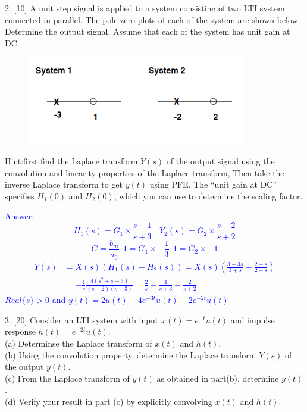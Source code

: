 \documentclass[12pt,a4paper]{article}
\begin{document}
\begin{tcolorbox}[colback = white]
2. [10] A unit step signal is applied to a system consisting of two LTI system connected in parallel. The pole-zero plots of each of the system are shown below. Determine the output signal. Assume that each of
the system has unit gain at DC.
\begin{figure}[H]
	\centering
	\includegraphics{HW6P2.png}
	\label{fig:fig1} 
\end{figure}
Hint:first find the Laplace transform $Y(s)$ of the output signal using the convolution and linearity properties of the Laplace transform, Then take the inverse Laplace transform to get $y(t)$ using PFE. The “unit gain at DC” specifies $H_{1}(0)$ and $H_{2}(0)$, which you can use to determine the scaling factor.

\end{tcolorbox}

\begin{tcolorbox}
\normalsize
\textcolor{blue}{Answer:\\
$$H_1(s)=G_1\times\frac{s-1}{s+3}~~~~Y_2(s)=G_2\times\frac{s-2}{s+2}$$
$$G=\frac{b_m}{a_0}~~1=G_1\times-\frac{1}{3}~~1=G_2\times -1$$
\begin{equation*}
    \begin{aligned}
        Y(s)&=X(s)(H_1(s)+H_2(s))=X(s)(\frac{3-3s}{3+s}+\frac{2-s}{2+s})\\
        &=-\frac{1}{s}\frac{4(s^2+s-3)}{(s+2)(s+3)}=\frac{2}{s}-\frac{4}{s+3}-\frac{2}{s+2}
    \end{aligned}
\end{equation*}
$Real\{s\}>0$ and $y(t)=2u(t)-4e^{-3t}u(t)-2e^{-2t}u(t)$
}
\end{tcolorbox}

\begin{tcolorbox}[colback = white]
3. [20] Consider an LTI system with input $x(t)=e^{-t}u(t)$ and impulse response $h(t)=e^{-2t}u(t)$. \\
(a) Determinse the Laplace transform of $x(t)$ and $h(t)$.\\
(b) Using the convolution property, determine the Laplace transform $Y(s)$ of the output $y(t)$.\\
(c) From the Laplace transform of $y(t)$ as obtained in part(b), determine $y(t)$.\\
(d) Verify your result in part (c) by explicitly convolving $x(t)$ and $h(t)$.\\


\end{tcolorbox}
\end{document}
